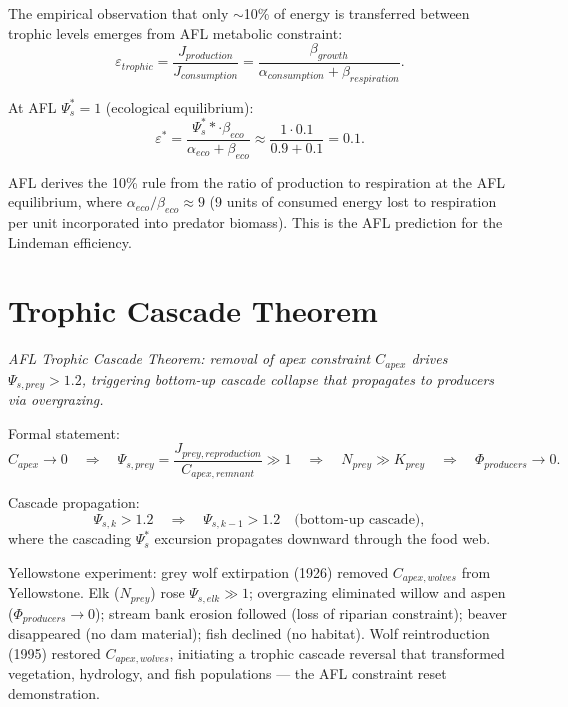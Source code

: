 \documentclass[11pt]{article}
\begin{document}
The empirical observation that only $\sim$10\% of energy is transferred between trophic levels
emerges from AFL metabolic constraint:
\begin{equation}
\varepsilon_{trophic} = \frac{J_{production}}{J_{consumption}} = \frac{\beta_{growth}}{\alpha_{consumption} + \beta_{respiration}}.
\end{equation}

At AFL $\Psi_s^* = 1$ (ecological equilibrium):
\begin{equation}
\varepsilon^* = \frac{\Psi_s^** \cdot \beta_{eco}}{\alpha_{eco} + \beta_{eco}} \approx \frac{1 \cdot 0.1}{0.9 + 0.1} = 0.1.
\end{equation}

AFL derives the 10\% rule from the ratio of production to respiration at the AFL equilibrium,
where $\alpha_{eco}/\beta_{eco} \approx 9$ (9 units of consumed energy lost to respiration per
unit incorporated into predator biomass). This is the AFL prediction for the Lindeman efficiency.

\section{Trophic Cascade Theorem}

\begin{center}
\textit{AFL Trophic Cascade Theorem: removal of apex constraint $C_{apex}$ drives $\Psi_{s,prey}
> 1.2$, triggering bottom-up cascade collapse that propagates to producers via overgrazing.}
\end{center}

Formal statement:
\begin{equation}
C_{apex} \to 0 \quad \Rightarrow \quad \Psi_{s,prey} = \frac{J_{prey,reproduction}}{C_{apex,remnant}} \gg 1
\quad \Rightarrow \quad N_{prey} \gg K_{prey} \quad \Rightarrow \quad \Phi_{producers} \to 0.
\end{equation}

Cascade propagation:
\begin{equation}
\Psi_{s,k} > 1.2 \quad \Rightarrow \quad \Psi_{s,k-1} > 1.2 \quad \text{(bottom-up cascade)},
\end{equation}
where the cascading $\Psi_s^*$ excursion propagates downward through the food web.

Yellowstone experiment: grey wolf extirpation (1926) removed $C_{apex,wolves}$ from Yellowstone.
Elk ($N_{prey}$) rose $\Psi_{s,elk} \gg 1$; overgrazing eliminated willow and aspen ($\Phi_{producers}
\to 0$); stream bank erosion followed (loss of riparian constraint); beaver disappeared (no dam
material); fish declined (no habitat). Wolf reintroduction (1995) restored $C_{apex,wolves}$,
initiating a trophic cascade reversal that transformed vegetation, hydrology, and fish populations
--- the AFL constraint reset demonstration.
\end{document}
